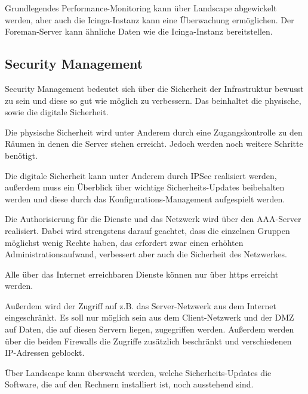 Grundlegendes Performance-Monitoring kann über Landscape abgewickelt werden, aber auch die Icinga-Instanz kann eine Überwachung ermöglichen. 
Der Foreman-Server kann ähnliche Daten wie die Icinga-Instanz bereitstellen.


\subsection{Security Management}
Security Management bedeutet sich über die Sicherheit der Infrastruktur bewusst zu sein und diese so gut wie möglich zu verbessern. Das beinhaltet die physische, sowie die digitale Sicherheit.

Die physische Sicherheit wird unter Anderem durch eine Zugangskontrolle zu den Räumen in denen die Server stehen erreicht. Jedoch werden noch weitere Schritte benötigt.

Die digitale Sicherheit kann unter Anderem durch IPSec realisiert werden, außerdem muss ein Überblick über wichtige Sicherheits-Updates beibehalten werden und diese durch das Konfigurations-Management aufgespielt werden.

Die Authorisierung für die Dienste und das Netzwerk wird über den AAA-Server realisiert. Dabei wird strengstens darauf geachtet, dass die einzelnen Gruppen möglichst wenig Rechte haben, das erfordert zwar einen erhöhten Administrationsaufwand, verbessert aber auch die Sicherheit des Netzwerkes.

Alle über das Internet erreichbaren Dienste können nur über https erreicht werden.

Außerdem wird der Zugriff auf z.B. das Server-Netzwerk aus dem Internet eingeschränkt. Es soll nur möglich sein aus dem Client-Netzwerk und der DMZ auf Daten, die auf diesen Servern liegen, zugegriffen werden. Außerdem werden über die beiden Firewalls die Zugriffe zusätzlich beschränkt und verschiedenen IP-Adressen geblockt.

Über Landscape kann überwacht werden, welche Sicherheits-Updates die Software, die auf den Rechnern installiert ist, noch ausstehend sind.
